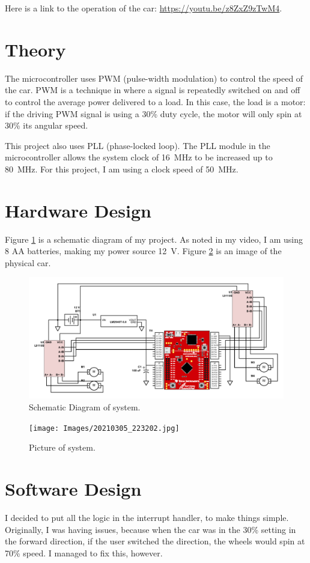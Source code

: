 \documentclass{article}
\begin{document}
Here is a link to the operation of the car: \url{https://youtu.be/z8ZxZ9zTwM4}.

\section{Theory}
The microcontroller uses PWM (pulse-width modulation) to control
the speed of the car. PWM is a technique in where a signal
is repeatedly switched on and off to control the average power
delivered to a load. In this case, the load is a motor: if the
driving PWM signal is using a 30\% duty cycle, the motor will
only spin at 30\% its angular speed.

This project also uses PLL (phase-locked loop). The PLL module
in the microcontroller allows the system clock of \SI{16}{\mega\hertz}
to be increased up to \SI{80}{\mega\hertz}. For this project,
I am using a clock speed of \SI{50}{\mega\hertz}.
\pagebreak
\section{Hardware Design}
Figure \ref{fig:schematic diagram}
is a schematic diagram of my project. As noted in my video, I
am using 8 AA batteries, making my power source \SI{12}{\volt}.
Figure \ref{fig:3d pic} is an image of the physical car.

\begin{figure}[H]
    \centering
    \includegraphics[width=\textwidth]{Images/schemeit-project.pdf}
    \caption{Schematic Diagram of system.}
    \label{fig:schematic diagram}
\end{figure}
\begin{figure}[H]
    \centering
    \texttt{[image: Images/20210305\_223202.jpg]}
    \caption{Picture of system.}
    \label{fig:3d pic}
\end{figure}

\section{Software Design}
I decided to put all the logic in the interrupt handler, to
make things simple. Originally, I was having issues, because
when the car was in the 30\% setting in the forward direction,
if the user switched the direction, the wheels would spin at
70\% speed. I managed to fix this, however.
\end{document}
